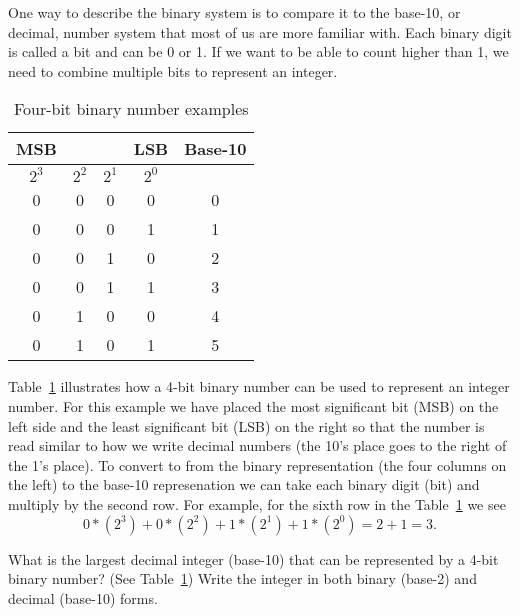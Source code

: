 One way to describe the binary system is to compare it to the base-10, or decimal, number system that most of us are more familiar with.  Each binary digit is called a \gls{bit} and can be 0 or 1.  If we want to be able to count higher than 1, we need to combine multiple bits to represent an integer.

\begin{table}[bt!] 
\renewcommand{\arraystretch}{1.2}
\caption{Four-bit binary number examples}
\label{t:binary}
\centering
\begin{tabular}{|c|c|c|c||c|}\hline
MSB &\hspace{4ex} & \hspace{4ex}& LSB & Base-10\\ \hline \hline
$2^3$ & $2^2$ & $2^1$ & $2^0$ & \\ \hline \hline
0 & 0 & 0 & 0 & 0 \\ \hline
0 & 0 & 0 & 1 & 1 \\ \hline
0 & 0 & 1 & 0 & 2 \\ \hline
0 & 0 & 1 & 1 & 3 \\ \hline
0 & 1 & 0 & 0 & 4 \\ \hline
0 & 1 & 0 & 1 & 5 \\ \hline
\end{tabular}
\end{table}

Table~\ref{t:binary} illustrates how a 4-bit binary number can be used to represent an integer number.  For this example we have placed the most significant bit (MSB) on the left side and the least significant bit (LSB) on the right so that the number is read similar to how we write decimal numbers (the 10's place goes to the right of the 1's place). To convert to from the binary representation (the four columns on the left) to the base-10 represenation we can take each binary digit (bit) and multiply by the second row.  For example, for the sixth row in the Table~\ref{t:binary} we see
\[
0*(2^3)+0*(2^2)+1*(2^1)+1*(2^0) = 2+1 = 3.
\]

\begin{ex}
What is the largest decimal integer (base-10) that can be represented by a 4-bit binary number?  (See Table~\ref{t:binary})  Write the integer in both binary (base-2) and decimal (base-10) forms.
\end{ex}

\ifsolutions

